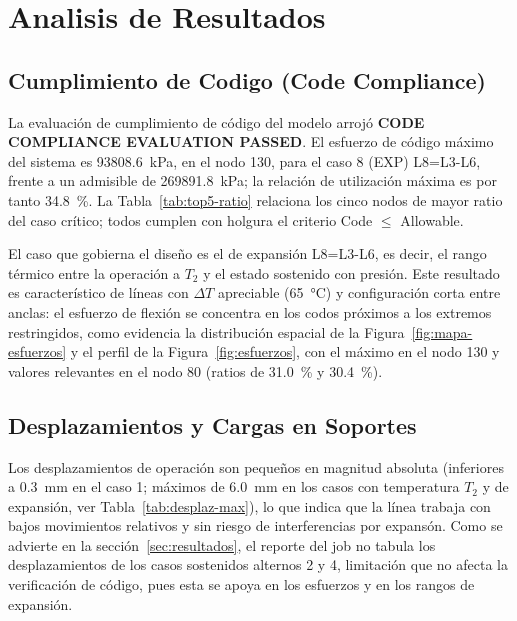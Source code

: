 \section{Analisis de Resultados}
\label{sec:analisis}

\subsection{Cumplimiento de Codigo (Code Compliance)}

La evaluaci\'{o}n de cumplimiento de c\'{o}digo del modelo arroj\'{o}
\textbf{CODE COMPLIANCE EVALUATION PASSED}. El esfuerzo de c\'{o}digo
m\'{a}ximo del sistema es \num{93808.6}~\si{kPa}, en el nodo 130, para el caso
8 (EXP) L8=L3-L6, frente a un admisible de \num{269891.8}~\si{kPa}; la
relaci\'{o}n de utilizaci\'{o}n m\'{a}xima es por tanto 34.8~\%. La
Tabla~\ref{tab:top5-ratio} relaciona los cinco nodos de mayor ratio del caso
cr\'{i}tico; todos cumplen con holgura el criterio Code $\leq$ Allowable.



El caso que gobierna el dise\~{n}o es el de expansi\'{o}n L8=L3-L6, es decir, el
rango t\'{e}rmico entre la operaci\'{o}n a $T_2$ y el estado sostenido con
presi\'{o}n. Este resultado es caracter\'{i}stico de l\'{i}neas con $\Delta T$
apreciable (65~\si{\celsius}) y configuraci\'{o}n corta entre anclas: el esfuerzo
de flexi\'{o}n se concentra en los codos pr\'{o}ximos a los extremos
restringidos, como evidencia la distribuci\'{o}n espacial de la
Figura~\ref{fig:mapa-esfuerzos} y el perfil de la Figura~\ref{fig:esfuerzos}, con
el m\'{a}ximo en el nodo 130 y valores relevantes en el nodo 80 (ratios de
31.0~\% y 30.4~\%).

\subsection{Desplazamientos y Cargas en Soportes}

Los desplazamientos de operaci\'{o}n son peque\~{n}os en magnitud absoluta
(inferiores a 0.3~\si{mm} en el caso 1; m\'{a}ximos de 6.0~\si{mm} en los casos
con temperatura $T_2$ y de expansi\'{o}n, ver Tabla~\ref{tab:desplaz-max}), lo
que indica que la l\'{i}nea trabaja con bajos
movimientos relativos y sin riesgo de interferencias por expans\'{o}n. Como se
advierte en la secci\'{o}n~\ref{sec:resultados}, el reporte del job no tabula
los desplazamientos de los casos sostenidos alternos 2 y 4, limitaci\'{o}n que
no afecta la verificaci\'{o}n de c\'{o}digo, pues esta se apoya en los
esfuerzos y en los rangos de expansi\'{o}n.

